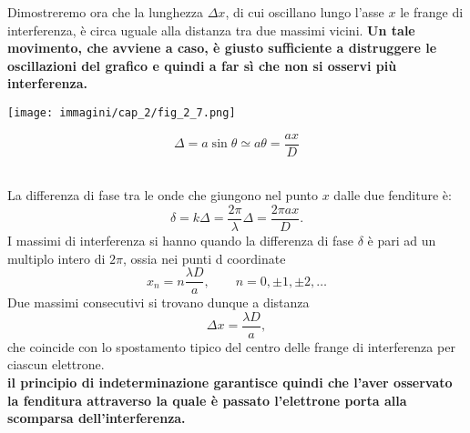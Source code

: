 \documentclass[a4paper,12pt,oneside]{book}
\begin{document}
Dimostreremo ora che la lunghezza $\Delta x$, di cui oscillano lungo l'asse $x$ le frange di interferenza, è circa uguale alla distanza tra due massimi vicini. \textbf{Un tale movimento, che avviene a caso, è giusto sufficiente a distruggere le oscillazioni del grafico e quindi a far sì che non si osservi più interferenza.}\\
\vspace{1cm}
\begin{minipage}{.5\textwidth}
\texttt{[image: immagini/cap\_2/fig\_2\_7.png]}	
\end{minipage}
\begin{minipage}{.5\textwidth}
\begin{equation}
\Delta = a \sin \theta \simeq a \theta = \frac{ax}{D}
\end{equation}
\end{minipage}\\
\vspace{.5cm}
La differenza di fase tra le onde che giungono nel punto $x$ dalle due fenditure è:
	\begin{equation}
		\delta = k\Delta =\frac{2 \pi }{\lambda}\Delta = \frac{2 \pi a x}{D}.
	\end{equation}
I massimi di interferenza si hanno quando la differenza di fase $\delta $ è pari ad un multiplo intero di $2 \pi$, ossia nei punti d coordinate
	\begin{equation}
		x_n =n\frac{\lambda D}{a}, \qquad n=0,\pm 1, \pm 2, \dots 
	\end{equation}
Due massimi consecutivi si trovano dunque a distanza 
	\begin{equation}
		\boxed{
			\Delta x = \frac{\lambda D}{a},
			}
	\end{equation}
che coincide con lo spostamento tipico del centro delle frange di interferenza per ciascun elettrone.\\

\textbf{il principio di indeterminazione garantisce quindi che l'aver osservato la fenditura attraverso la quale è passato l'elettrone porta alla scomparsa dell'interferenza.}
\end{document}
